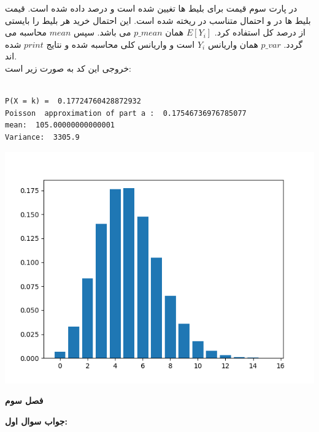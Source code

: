 \documentclass[a4paper,14pt]{article}
\begin{document}
در پارت سوم قیمت برای بلیط ها تغیین شده است و درصد داده شده است. قیمت بلیط ها در  و احتمال متناسب در  ریخته شده است. این احتمال خرید هر بلیط را بایستی از درصد کل استفاده کرد.
$E[Y_i]$ همان $p\_mean$ می باشد.
سپس $mean$ محاسبه می گردد. $p\_var$ همان واریانس $Y_i$ است و واریانس کلی محاسبه شده و نتایج $print$ شده اند.\\

خروجی این کد به صورت زیر است:\\

\begin{latin}
	\begin{lstlisting}

P(X = k) =  0.17724760428872932
Poisson  approximation of part a :  0.17546736976785077
mean:  105.00000000000001
Variance:  3305.9

	\end{lstlisting}
\end{latin}

\begin{center}
	\includegraphics{pic6.png}
\end{center}


\begin{center}
	{\LARGE
		\textbf{فصل سوم}
	}
\end{center}

\textbf{جواب سوال اول:}\\
\end{document}
